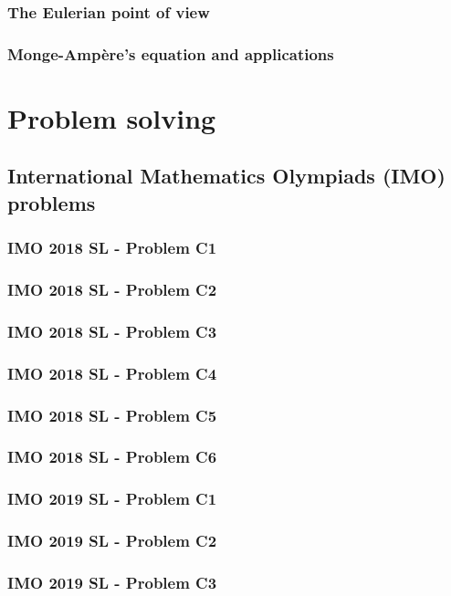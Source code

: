 \documentclass[12pt,openany,oneside]{book}
\theoremstyle{definition}
\numberwithin{definition}{section}
\numberwithin{theorem}{section}
\numberwithin{corollary}{section}
\numberwithin{proposition}{section}
\numberwithin{notation}{section}
\numberwithin{remark}{section}
\numberwithin{hypothesis}{section}
\numberwithin{example}{section}
\begin{document}
\section{The Eulerian point of view}
\section{Monge-Ampère's equation and applications}

\part{Problem solving}

\chapter{International Mathematics Olympiads (IMO) problems}

\section{IMO 2018 SL - Problem C1}
\section{IMO 2018 SL - Problem C2}
\section{IMO 2018 SL - Problem C3}
\section{IMO 2018 SL - Problem C4}
\section{IMO 2018 SL - Problem C5}
\section{IMO 2018 SL - Problem C6}

\section{IMO 2019 SL - Problem C1}
\section{IMO 2019 SL - Problem C2}
\section{IMO 2019 SL - Problem C3}
\end{document}
